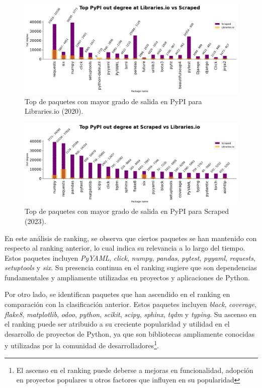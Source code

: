 \begin{figure}[ht!]
    \begin{center}
        \includegraphics[width=1\textwidth]{img/pypi/libio_t20_outd_comparison.png}
        \caption{Top de paquetes con mayor grado de salida en PyPI para Libraries.io (2020).}
        \label{fig:pypi_libio_outd_comparison}
    \end{center}
\end{figure}

\begin{figure}[ht!]
    \begin{center}
        \includegraphics[width=1\textwidth]{img/pypi/libio_scraped_t20_comparation.png}
        \caption{Top de paquetes con mayor grado de salida en PyPI para Scraped (2023).}
        \label{fig:pypi_scraped_outd_comparison}
    \end{center}
\end{figure}

En este análisis de ranking, se observa que ciertos paquetes se han mantenido con respecto al ranking
anterior, lo cual indica su relevancia a lo largo del tiempo. Estos
paquetes incluyen \textit{PyYAML}, \textit{click}, \textit{numpy}, \textit{pandas}, \textit{pytest},
\textit{pyyaml}, \textit{requests}, \textit{setuptools} y \textit{six}. Su presencia continua en el
ranking sugiere que son dependencias fundamentales y ampliamente utilizadas en proyectos y aplicaciones
de Python.

Por otro lado, se identifican paquetes que han ascendido en el ranking en comparación con la clasificación
anterior. Estos paquetes incluyen \textit{black}, \textit{coverage}, \textit{flake8}, \textit{matplotlib},
\textit{odoo}, \textit{python}, \textit{scikit}, \textit{scipy}, \textit{sphinx}, \textit{tqdm} y
\textit{typing}. Su ascenso en el ranking puede ser atribuido a su creciente popularidad y utilidad en el
desarrollo de proyectos de Python, ya que son bibliotecas ampliamente conocidas y utilizadas por la
comunidad de desarrolladores\footnote{El ascenso en el ranking puede deberse a mejoras en funcionalidad,
    adopción en proyectos populares u otros factores que influyen en su popularidad}.

